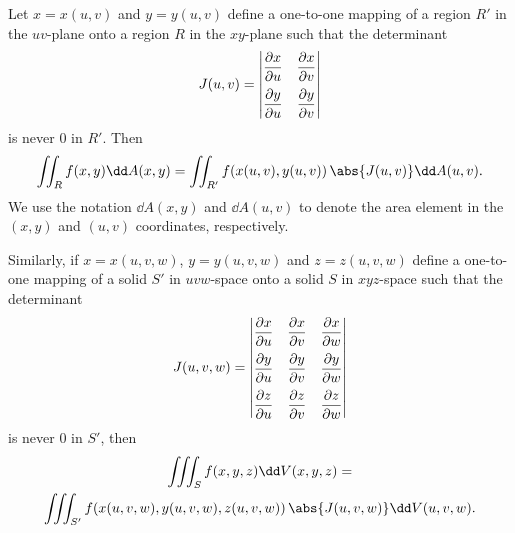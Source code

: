 {
\begin{theorem}\label{thm:changevarint}%
Let $x=x(u,v)$ and $y=y(u,v)$ define a one-to-one mapping of a region $R'$ in the $uv$-plane onto a region $R$ in the $xy$-plane such that the determinant
  \begin{equation}\label{eqn:jacob2}%
   J(u,v) =
    \begin{vmatrix}
     \dfrac{\partial x}{\partial u} & \dfrac{\partial x}{\partial v}\vspace{2mm}\\
     \dfrac{\partial y}{\partial u} & \dfrac{\partial y}{\partial v}
    \end{vmatrix}
  \end{equation}
  is never $0$ in $R'$. Then
  \begin{equation}\label{eqn:changevarint2}%
   \iint_{R} f(x,y)\dd A(x,y)
   = \iint_{R'} f(x(u,v),y(u,v))\,\abs{J(u,v)}\dd A(u,v) .
  \end{equation}
  We use the notation $\dd A(x,y)$ and $\dd A(u,v)$ to denote the area element in the $(x,y)$ and $(u,v)$ coordinates, respectively.

  Similarly, if $x=x(u,v,w)$, $y=y(u,v,w)$ and $z=z(u,v,w)$ define a one-to-one mapping of a solid $S'$ in $uvw$-space onto a solid $S$ in $xyz$-space such that the determinant
  \begin{equation}\label{eqn:jacob3}%
   J(u,v,w) =
    \begin{vmatrix}
     \dfrac{\partial x}{\partial u} & \dfrac{\partial x}{\partial v} & \dfrac{\partial x}{\partial w}\vspace{2mm}\\
     \dfrac{\partial y}{\partial u} & \dfrac{\partial y}{\partial v} & \dfrac{\partial y}{\partial w}\vspace{2mm}\\
     \dfrac{\partial z}{\partial u} & \dfrac{\partial z}{\partial v} & \dfrac{\partial z}{\partial w}
    \end{vmatrix}
  \end{equation}
  is never $0$ in $S'$, then
  \begin{multline}\label{eqn:changevarint3}%
   \iiint_{S} f(x,y,z)\dd V(x,y,z) =\\
   \iiint_{S'} f(x(u,v,w),y(u,v,w),z(u,v,w))\,\abs{J(u,v,w)}\dd V(u,v,w).
  \end{multline}
\end{theorem}}

